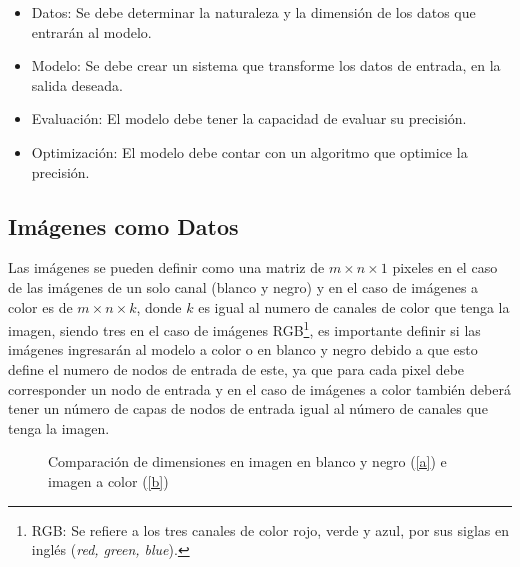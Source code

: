 \begin{itemize}
    \item Datos: Se debe determinar la naturaleza y la dimensión de los datos que entrarán al modelo.
    \item Modelo: Se debe crear un sistema que transforme los datos de entrada, en la salida deseada.
    \item Evaluación: El modelo debe tener la capacidad de evaluar su precisión.
    \item Optimización: El modelo debe contar con un algoritmo que optimice la precisión.
\end{itemize}

\subsection{Imágenes como Datos}
Las imágenes se pueden definir como una matriz de $m \times n \times 1$ pixeles en el caso de las imágenes de un solo canal (blanco y negro) y en el caso de imágenes a color es de $m \times n \times k$, donde $k$ es igual al numero de canales de color que tenga la imagen, siendo tres en el caso de imágenes RGB\footnote{RGB: Se refiere a los tres canales de color rojo, verde y azul, por sus siglas en inglés (\emph{red, green, blue}).}, es importante definir si las imágenes ingresarán al modelo a color o en blanco y negro debido a que esto define el numero de nodos de entrada de este, ya que para cada pixel debe corresponder un nodo de entrada y en el caso de imágenes a color también deberá tener un número de capas de nodos de entrada igual al número de canales que tenga la imagen.

\begin{figure}[!htp]
    \centering
    \qquad
    \caption{Comparación de dimensiones en imagen en blanco y negro (\ref{a}) e imagen a color (\ref{b})}
    \label{matrix_img}
\end{figure}

